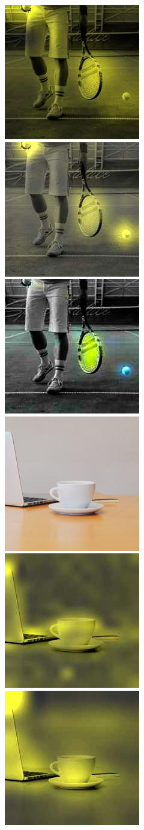 \begin{figure}[t]
        \includegraphics[width = 0.19\linewidth]{figs/attention_fig_main/gray_resnet50_attention_mean_pexels-cottonbro-5739196.jpg} \hfill
         \includegraphics[width = 0.19\linewidth]{figs/attention_fig_main/gray_S60_attention_mean_pexels-cottonbro-5739196.jpg} \hfill
         \includegraphics[width = 0.19\linewidth]{figs/attention_fig_main/gray_attn_multi_pexels-cottonbro-5739196.jpg}\\%
        \includegraphics[width = 0.19\linewidth]{figs/attention_fig_main/pexels-pixabay-257894.jpg} \hfill
         \includegraphics[width = 0.19\linewidth]{figs/attention_fig_main/gray_vit_S_attention_mean_pexels-pixabay-257894.jpg} \hfill
        \includegraphics[width = 0.19\linewidth]{figs/attention_fig_main/gray_resnet50_attention_mean_pexels-pixabay-257894.jpg} \hfill

\end{figure}
